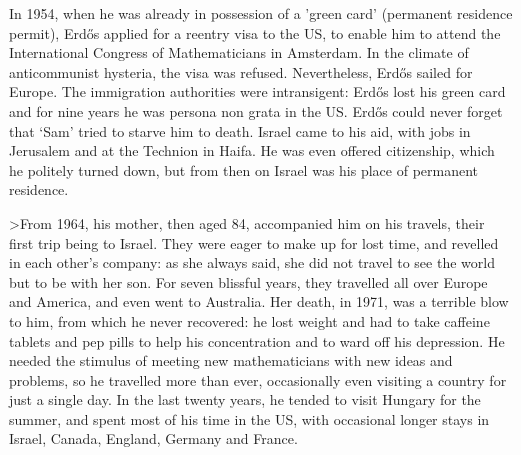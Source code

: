 In 1954, when he was already in possession of a 'green card' (permanent 
residence permit), Erd\H{o}s applied for a reentry visa to the US, to enable
him to attend the International Congress of Mathematicians in Amsterdam. In 
the climate of anticommunist hysteria, the visa was refused. Nevertheless,
Erd\H{o}s sailed for Europe. The immigration authorities were intransigent:
Erd\H{o}s lost his green card and for nine years he was persona non grata 
in the US. Erd\H{o}s could never forget that `Sam' tried to starve him to 
death. Israel came to his aid, with jobs in 
Jerusalem and at the Technion in Haifa. He was even offered citizenship,
which he politely turned down, but from then on Israel was his place of 
permanent residence.

>From 1964, his mother, then aged 84, accompanied him on his travels, their
first trip being to Israel. They were eager to make up for lost time, and
revelled in each other's company: as she always said, she did not travel
to see the world but to be with her son. For seven blissful years, they 
travelled all over Europe and America, and even went to Australia. Her 
death, in 1971, was a terrible blow to him, from which he never recovered:
he lost weight and had to take caffeine tablets and pep pills to help his
concentration and to ward off his depression. He needed the stimulus of 
meeting new mathematicians with new ideas and problems, so he travelled more
than ever, occasionally even visiting a country for just a single day.
In the last twenty years, he tended to visit Hungary for the summer, and
spent most of his time in the US, with occasional longer stays in 
Israel, Canada, England, Germany and France.


